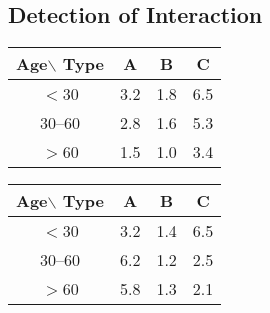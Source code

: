 \subsection*{Detection of Interaction}
\begin{center}
    \begin{tabular}{c|ccc}
        Age$\backslash$ Type & A   & B   & C   \\
        \hline
        $<$30                & 3.2 & 1.8 & 6.5 \\
        30--60               & 2.8 & 1.6 & 5.3 \\
        $>$60                & 1.5 & 1.0 & 3.4
    \end{tabular}
\end{center}
\begin{center}
    \begin{tabular}{c|ccc}
        Age$\backslash$ Type & A   & B   & C   \\
        \hline
        $<$30                & 3.2 & 1.4 & 6.5 \\
        30--60               & 6.2 & 1.2 & 2.5 \\
        $>$60                & 5.8 & 1.3 & 2.1
    \end{tabular}
\end{center}